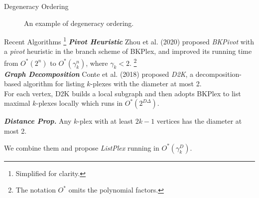 \documentclass[9pt,notheorems]{beamer} %
\begin{document}
\begin{frame}{Degeneracy Ordering}
\begin{figure}
{\begin{center}
            \end{center}
        }
        \caption{An example of degeneracy ordering.}
    \end{figure}
\end{frame}
\begin{frame}{Recent Algorithms  \footnote{Simplified for clarity.}}
    \textbf{\emph{Pivot Heuristic}} Zhou et al. (2020) proposed \emph{BKPivot} with a \emph{pivot} heuristic in the branch scheme of BKPlex, and improved its running time from $O^*(2^n)$ to $O^*(\gamma_k^n)$, where $\gamma_k<2$. \footnote{The notation $O^*$ omits the polynomial factors.}\\
    \vspace{0.5cm}    
    \textbf{\emph{Graph Decomposition}} Conte et al. (2018) proposed \emph{D2K}, a decomposition-based algorithm for listing $k$-plexes with the diameter at most 2.\\
    For each vertex, D2K builds a local subgraph and then adopts BKPlex to list maximal $k$-plexes locally which runs in $O^*(2^{D\Delta})$.\\
    \vspace{0.25cm}
    \begin{flushright}
        \footnotesize \textbf{\emph{Distance Prop.}} Any $k$-plex with at least $2k-1$ vertices has the diameter at most 2.
    \end{flushright}
    \pause
    \vspace{0.5cm}
    \begin{center}
        We combine them and propose \emph{ListPlex} running in $O^*(\gamma_k^D)$.
    \end{center}
\end{frame}
\end{document}
